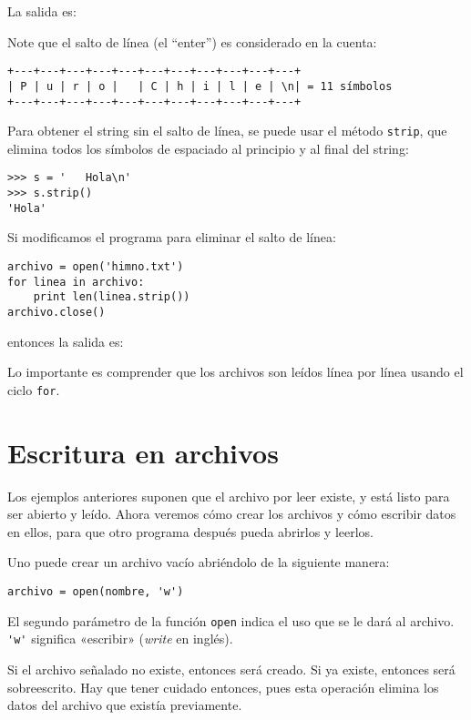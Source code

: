 La salida es:

Note que el salto de línea (el ``enter'') es considerado en la cuenta:

\begin{lstlisting}
+---+---+---+---+---+---+---+---+---+---+---+
| P | u | r | o |   | C | h | i | l | e | \n| = 11 símbolos
+---+---+---+---+---+---+---+---+---+---+---+
\end{lstlisting}

Para obtener el string sin el salto de línea, se puede usar el método
\lstinline!strip!, que elimina todos los símbolos de espaciado al
principio y al final del string:

\begin{lstlisting}
>>> s = '   Hola\n'
>>> s.strip()
'Hola'
\end{lstlisting}

Si modificamos el programa para eliminar el salto de línea:

\begin{lstlisting}
archivo = open('himno.txt')
for linea in archivo:
    print len(linea.strip())
archivo.close()
\end{lstlisting}

entonces la salida es:

Lo importante es comprender que los archivos son leídos línea por línea
usando el ciclo \lstinline!for!.

\section{Escritura en archivos}

Los ejemplos anteriores suponen que el archivo por leer existe, y está
listo para ser abierto y leído. Ahora veremos cómo crear los archivos y
cómo escribir datos en ellos, para que otro programa después pueda
abrirlos y leerlos.

Uno puede crear un archivo vacío abriéndolo de la siguiente manera:

\begin{lstlisting}
archivo = open(nombre, 'w')
\end{lstlisting}

El segundo parámetro de la función \lstinline!open! indica el uso que se
le dará al archivo. \lstinline!'w'! significa «escribir» (\emph{write}
en inglés).

Si el archivo señalado no existe, entonces será creado. Si ya existe,
entonces será sobreescrito. Hay que tener cuidado entonces, pues esta
operación elimina los datos del archivo que existía previamente.

